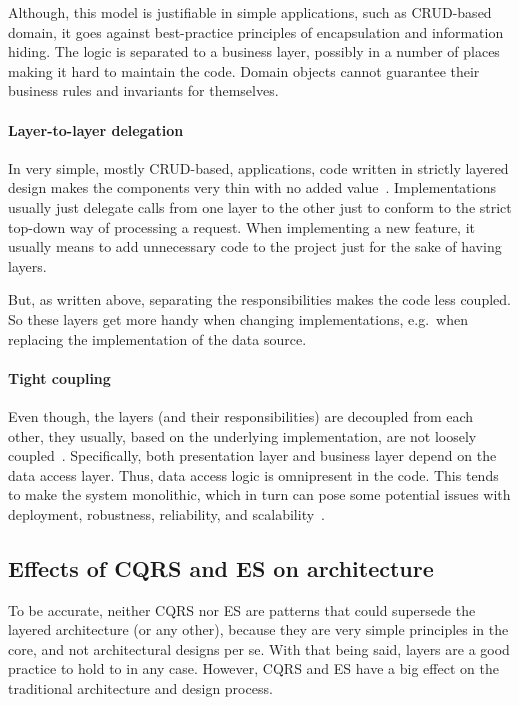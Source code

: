 \documentclass{book}
\begin{document}
Although, this model is justifiable in simple applications, such as
CRUD-based domain, it goes against best-practice principles of
encapsulation and information hiding. The logic is separated to a
business layer, possibly in a number of places making it hard to
maintain the code. Domain objects cannot guarantee their business rules
and invariants for themselves.

\paragraph{Layer-to-layer delegation}\label{layer-to-layer-delegation}

In very simple, mostly CRUD-based, applications, code written in
strictly layered design makes the components very thin with no added
value~\cite{oreilly}. Implementations usually just delegate calls from
one layer to the other just to conform to the strict top-down way of
processing a request. When implementing a new feature, it usually means
to add unnecessary code to the project just for the sake of having
layers.

But, as written above, separating the responsibilities makes the code
less coupled. So these layers get more handy when changing
implementations, e.g.~when replacing the implementation of the data
source.

\paragraph{Tight coupling}\label{tight-coupling}

Even though, the layers (and their responsibilities) are decoupled from
each other, they usually, based on the underlying implementation, are
not loosely coupled~\cite{oreilly}. Specifically, both presentation
layer and business layer depend on the data access layer. Thus, data
access logic is omnipresent in the code. This tends to make the system
monolithic, which in turn can pose some potential issues with
deployment, robustness, reliability, and scalability~\cite{oreilly}.


\subsection{Effects of CQRS and ES on
architecture}\label{effects-of-cqrs-and-es-on-architecture}

To be accurate, neither CQRS nor ES are patterns that could supersede
the layered architecture (or any other), because they are very simple
principles in the core, and not architectural designs per se. With that
being said, layers are a good practice to hold to in any case. However,
CQRS and ES have a big effect on the traditional architecture and design
process.
\end{document}
